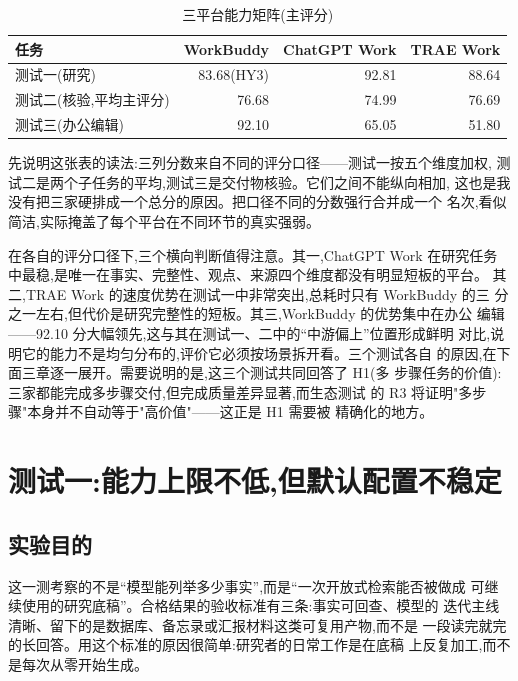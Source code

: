 \documentclass[
  12pt,
  a4paper,
  oneside,
  headings=normal,
  numbers=noendperiod,
  listof=totoc,
  bibliography=totoc
]{scrreprt}
\newenvironment{hfhtable}[1][htbp]
  {\begin{table}[#1]\centering\footnotesize\setstretch{1}}
  {\end{table}}
\newcommand{\source}[1]{%
  \par\vspace{3pt}{\footnotesize
    数据来源: #1\par}}
\begin{document}
\begin{hfhtable}
  \caption{三平台能力矩阵(主评分)}
  \label{tab:matrix}
  \begin{tabularx}{\textwidth}{@{}Yrrr@{}}
    \toprule
    \textbf{任务} & \textbf{WorkBuddy} & \textbf{ChatGPT Work} & \textbf{TRAE Work} \\
    \midrule
    测试一(研究) & 83.68(HY3) & 92.81 & 88.64 \\
    测试二(核验,平均主评分) & 76.68 & 74.99 & 76.69 \\
    测试三(办公编辑) & 92.10 & 65.05 & 51.80 \\
    \bottomrule
  \end{tabularx}
  \source{三项测试评分结果,口径见第 2 章}
\end{hfhtable}

先说明这张表的读法:三列分数来自不同的评分口径——测试一按五个维度加权,
测试二是两个子任务的平均,测试三是交付物核验。它们之间不能纵向相加,
这也是我没有把三家硬排成一个总分的原因。把口径不同的分数强行合并成一个
名次,看似简洁,实际掩盖了每个平台在不同环节的真实强弱。

在各自的评分口径下,三个横向判断值得注意。其一,ChatGPT Work 在研究任务
中最稳,是唯一在事实、完整性、观点、来源四个维度都没有明显短板的平台。
其二,TRAE Work 的速度优势在测试一中非常突出,总耗时只有 WorkBuddy 的三
分之一左右,但代价是研究完整性的短板。其三,WorkBuddy 的优势集中在办公
编辑——92.10 分大幅领先,这与其在测试一、二中的“中游偏上”位置形成鲜明
对比,说明它的能力不是均匀分布的,评价它必须按场景拆开看。三个测试各自
的原因,在下面三章逐一展开。需要说明的是,这三个测试共同回答了 H1(多
步骤任务的价值):三家都能完成多步骤交付,但完成质量差异显著,而生态测试
的 R3 将证明"多步骤"本身并不自动等于"高价值"——这正是 H1 需要被
精确化的地方。

\chapter{测试一:能力上限不低,但默认配置不稳定}

\section{实验目的}

这一测考察的不是“模型能列举多少事实”,而是“一次开放式检索能否被做成
可继续使用的研究底稿”。合格结果的验收标准有三条:事实可回查、模型的
迭代主线清晰、留下的是数据库、备忘录或汇报材料这类可复用产物,而不是
一段读完就完的长回答。用这个标准的原因很简单:研究者的日常工作是在底稿
上反复加工,而不是每次从零开始生成。
\end{document}
